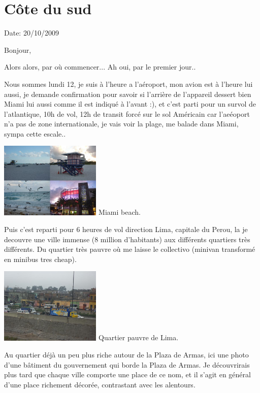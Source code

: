 \section{Côte du sud}

Date: 20/10/2009

\begin{multicols}{2}

Bonjour,

Alors alors, par où commencer... Ah oui, par le premier jour..

Nous sommes lundi 12, je suis à l'heure a l'aéroport, mon avion est à l'heure lui aussi, je demande confirmation pour savoir si l'arrière de l'appareil dessert bien Miami lui aussi comme il est indiqué à l'avant :), et c'est parti pour un survol de l'atlantique, 10h de vol, 12h de transit forcé sur le sol Américain car l'aeéoport n'a pas de zone internationale, je vais voir la plage, me balade dans Miami, sympa cette escale..

\hspace*{-0.65cm}
\includegraphics[width=4.8cm]{articles/Cote-du-sud/1255996649K0tQ.jpg}
Miami beach.


Puis c'est reparti pour 6 heures de vol direction Lima, capitale du Perou, la je decouvre une ville immense (8 million d'habitants) aux différents quartiers très différents. Du quartier très pauvre où me laisse le collectivo (minivan transformé en minibus tres cheap).

\hspace*{-0.65cm}
\includegraphics[width=4.8cm]{articles/Cote-du-sud/1255996655Vfsf.jpg}
Quartier pauvre de Lima.


Au quartier déjà un peu plus riche autour de la Plaza de Armas, ici une photo d'une bâtiment du gouvernement qui borde la Plaza de Armas. Je découvrirais plus tard que chaque ville comporte une place de ce nom, et il s'agit en général d'une place richement décorée, contrastant avec les alentours.


\end{multicols}
